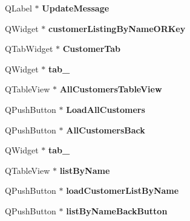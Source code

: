\begin{DoxyCompactItemize}
Q\+Label $\ast$ {\bfseries Update\+Message}
\item 
\mbox{\label{class_ui___main_window_af0f23ae17a2f7f0388ae7df66c367812}} 
Q\+Widget $\ast$ {\bfseries customer\+Listing\+By\+Name\+O\+R\+Key}
\item 
\mbox{\label{class_ui___main_window_abe1649ddacf80b18a39bb95c0150f93f}} 
Q\+Tab\+Widget $\ast$ {\bfseries Customer\+Tab}
\item 
\mbox{\label{class_ui___main_window_ade7c1b9f7cb71a865cc304772c36278f}} 
Q\+Widget $\ast$ {\bfseries tab\+\_}
\item 
\mbox{\label{class_ui___main_window_aeb6f5ffc1a5df29e2623ec4646f557f8}} 
Q\+Table\+View $\ast$ {\bfseries All\+Customers\+Table\+View}
\item 
\mbox{\label{class_ui___main_window_a44a5bfe048659b9df92a1cb783b4747b}} 
Q\+Push\+Button $\ast$ {\bfseries Load\+All\+Customers}
\item 
\mbox{\label{class_ui___main_window_a1844aa645741d49bf37807dcbc65258d}} 
Q\+Push\+Button $\ast$ {\bfseries All\+Customers\+Back}
\item 
\mbox{\label{class_ui___main_window_a7d8a29446578759800fab35c698b6be2}} 
Q\+Widget $\ast$ {\bfseries tab\+\_}
\item 
\mbox{\label{class_ui___main_window_aad299058bf01bb3c03aae4f8affd1047}} 
Q\+Table\+View $\ast$ {\bfseries list\+By\+Name}
\item 
\mbox{\label{class_ui___main_window_ad7e0563f38616381c6355ec27bbdce18}} 
Q\+Push\+Button $\ast$ {\bfseries load\+Customer\+List\+By\+Name}
\item 
\mbox{\label{class_ui___main_window_afb5d4410c393138c9b896a84d43895dd}} 
Q\+Push\+Button $\ast$ {\bfseries list\+By\+Name\+Back\+Button}
\item 
\mbox{\label{class_ui___main_window_aa9899d9e0d47ad34988a47a9d58c9d4c}} 

\end{DoxyCompactItemize}
